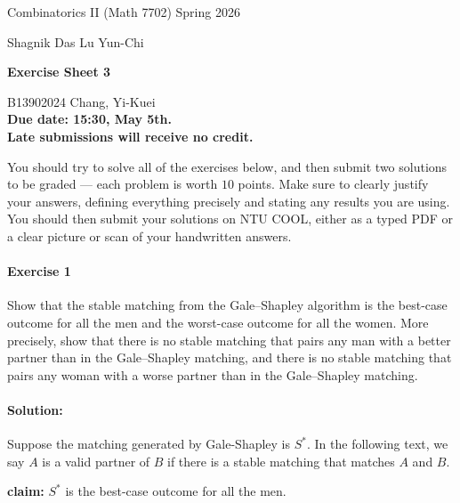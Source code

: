\documentclass[a4paper,12pt]{article}
\newcommand{\courseTitle}{Combinatorics II (Math 7702)}
\newcommand{\semester}{Spring 2026}
\newcommand{\instructorA}{Shagnik Das}
\newcommand{\instructorB}{Lu Yun-Chi}
\newcommand{\sheetNumber}{3}
\newcommand{\dueDate}{15:30, May 5th.}
\newcommand{\lateWarning}{Late submissions will receive no credit.}
\newcommand{\buildtitle}[4]{
\begin{flushleft}
{\large
#1
\hfill{}
#2
\par
#3
}
\end{flushleft}
\vskip 4pt
\begin{center}
{\large\bfseries#4\par}
\end{center}
\bigskip
}
\begin{document}
\buildtitle{\courseTitle{}}{\semester}{\instructorA{} \hfill \instructorB{}}{Exercise Sheet \sheetNumber{}}

\vspace{-0.2in}

\begin{center}

{B13902024 Chang, Yi-Kuei \\ \bf Due date: \dueDate \\ \lateWarning}

\end{center}

\noindent You should try to solve all of the exercises below, and then submit two solutions to be graded --- each problem is worth $10$ points. Make sure to clearly justify your answers, defining everything precisely and stating any results you are using. You should then submit your solutions on NTU COOL, either as a typed PDF or a clear picture or scan of your handwritten answers.

\paragraph{Exercise 1}  Show that the stable matching from the Gale--Shapley algorithm is the best-case outcome for all the men and the worst-case outcome for all the women. More precisely, show that there is no stable matching that pairs any man with a better partner than in the Gale--Shapley matching, and there is no stable matching that pairs any woman with a worse partner than in the Gale--Shapley matching.

\paragraph{Solution:} Suppose the matching generated by Gale-Shapley is \(S^*\). In the following text, we say \(A\) is a valid partner of \(B\) if there is a stable matching that matches \(A\) and \(B\). 

\textbf{claim:} \(S^*\) is the best-case outcome for all the men. 
\end{document}
